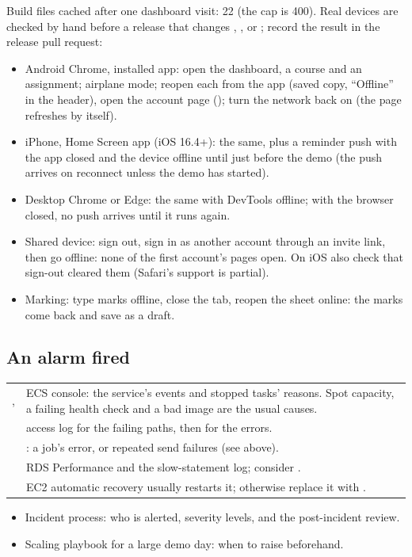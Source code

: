 Build files cached after one dashboard visit: 22 (the cap is 400). Real devices are checked by hand
before a release that changes , ,  or ; record the result
in the release pull request:
\begin{itemize}
  \item Android Chrome, installed app: open the dashboard, a course and an assignment; airplane
    mode; reopen each from the app (saved copy, ``Offline'' in the header), open the account page
    (); turn the network back on (the page refreshes by itself).
  \item iPhone, Home Screen app (iOS 16.4+): the same, plus a reminder push with the app closed
    and the device offline until just before the demo (the push arrives on reconnect unless the
    demo has started).
  \item Desktop Chrome or Edge: the same with DevTools offline; with the browser closed, no push
    arrives until it runs again.
  \item Shared device: sign out, sign in as another account through an invite link, then go
    offline: none of the first account's pages open. On iOS also check that sign-out cleared them
    (Safari's  support is partial).
  \item Marking: type marks offline, close the tab, reopen the sheet online: the marks come back
    and save as a draft.
\end{itemize}

\subsection{An alarm fired}
\begin{xltabular}{\linewidth}{@{}P{40mm} L@{}}
  \toprule
   & \\
  \midrule
  ,  & ECS console: the service's events and stopped tasks' reasons. Spot capacity, a failing health check and a bad image are the usual causes.\\
   &  access log for the failing paths, then  for the errors.\\
   & : a job's error, or repeated send failures (see above).\\
   & RDS Performance and the slow-statement log; consider .\\
   & EC2 automatic recovery usually restarts it; otherwise replace it with .\\
  \bottomrule
\end{xltabular}

\begin{todo}
  \begin{itemize}
    \item Incident process: who is alerted, severity levels, and the post-incident review.
    \item Scaling playbook for a large demo day: when to raise  beforehand.
  \end{itemize}
\end{todo}
